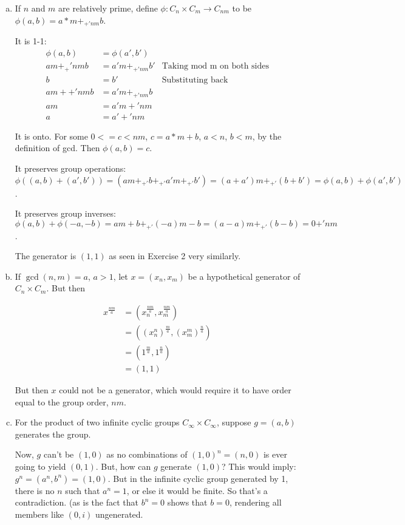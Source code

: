 \documentclass[11pt,oneside]{article}
\numberwithin{equation}{section}
\theoremstyle{definition}
\def\pmod{+'}
\begin{document}
\begin{solution}
  \begin{enumerate}[(a)]
  \item

    If $n$ and $m$ are relatively prime,
    define $\phi : C_n \times C_m \to C_{nm}$ to
    be $\phi(a,b) = a*m +_{\pmod{nm}} b$.

    It is 1-1:
    \begin{align*}
      \phi(a,b) & =\phi(a', b') & \\
      am +_\pmod{nm} b & = a' m +_{\pmod{nm}} b' & \textrm{Taking mod m on both sides} & \\
      b & = b' & \textrm {Substituting back} \\
      am + \pmod{nm} b & = a' m +_{\pmod{nm}} b & \\
      am & = a'm \pmod{nm} & \\
      a & = a' \pmod{nm} &
    \end{align*}

    It is onto.  For some $0 <= c < nm$, $c = a * m + b$, $a < n$,
    $b<m$, by the definition of gcd.  Then $\phi(a, b) = c$.

    It preserves group operations: $\phi((a, b) + (a', b')) =
    (am +_{\pmod} b +_{\pmod} a'm +_{\pmod} b') = (a+a')m +_{\pmod} (b+b') = \phi(a,b) + \phi(a', b')$.

    It preserves group inverses: $\phi(a, b) + \phi(-a, -b) =
    am + b +_{\pmod} (-a)m -b = (a-a)m +_{\pmod} (b - b) = 0 {\pmod{nm}}$.

    The generator is $(1, 1)$ as seen in Exercise 2 very similarly.  
    
  \item
    If $\gcd(n, m) = a$, $a>1$, let $x = (x_n, x_m)$ be a hypothetical
    generator of $C_n \times C_m$.  But then

    \begin{align*}
      x ^ {\frac{nm}{a}} & = (x_n ^ {\frac{nm}{a}}, x_m ^{\frac{nm}{a}}) & \\
      & = ((x_n ^ n) ^ {\frac{m}{a}}, (x_m ^m)^{\frac{n}{a}}) & \\
      & = (1 ^ {\frac{m}{a}}, 1 ^ {\frac{n}{a}}) & \\
      & = (1, 1)
    \end{align*}
    
    But then $x$ could not be a generator, which would require it to have
    order equal to the group order, $nm$.
  \item
    For the product of two infinite cyclic groups $C_\infty \times C_\infty$,
    suppose $ g = (a, b)$ generates the group.

    Now, $g$ can't be $(1,0)$ as no combinations of $(1,0) ^n = (n,
    0)$ is ever going to yield $(0,1)$.  But, how can $g$ generate
    $(1,0)$? This would imply: $g ^ n = (a ^ n, b^n) = (1, 0)$.  But
    in the infinite cyclic group generated by 1, there is no $n$ such
    that $a ^n = 1 $, or else it would be finite.  So that's a
    contradiction.  (as is the fact that $b^n =0$ shows that $b = 0$,
    rendering all members like $(0, i)$ ungenerated.  
  \end{enumerate}
\end{solution}
\end{document}
